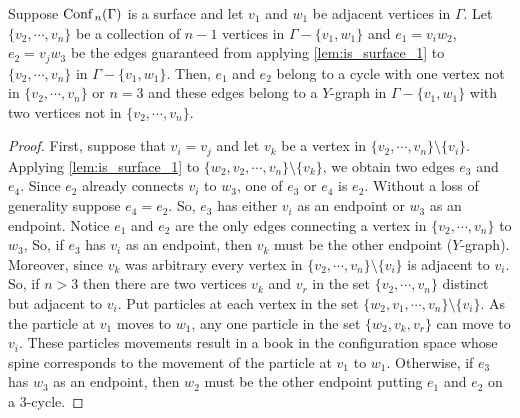 \begin{lem}
    \label{lem:is_surface_2}
    Suppose \(\text{Conf}\,_n(\Gamma)\) is a surface and let \(v_1\) and \(w_1\) be adjacent vertices in \(\Gamma\).
    Let \(\{v_2, \cdots, v_n\}\) be a collection of \(n-1\) vertices in \(\Gamma - \{v_1, w_1\}\) and \(e_1 = v_i w_2\), \(e_2 = v_j w_3\) be the edges guaranteed 
    from applying \ref{lem:is_surface_1} to \(\{v_2, \cdots, v_n\}\) in \(\Gamma - \{v_1, w_1\}\).
    Then, \(e_1\) and \(e_2\) belong to a cycle with one vertex not in \(\{v_2, \cdots, v_n\}\) or 
    \(n = 3\) and these edges belong to a \(Y\)-graph in \(\Gamma - \{v_1, w_1\}\)
    with two vertices not in \(\{v_2, \cdots, v_n\}\).
\end{lem}
\begin{proof}
    First, suppose that \(v_i = v_j\) and let \(v_k\) be a vertex in \(\{v_2, \cdots, v_n\}\setminus\{v_i\}\).
    Applying \ref{lem:is_surface_1} to \(\{w_2, v_2, \cdots, v_n\}\setminus\{v_k\}\),
    we obtain two edges \(e_3\) and \(e_4\).
    Since \(e_2\) already connects \(v_i\) to \(w_3\), one of \(e_3\) or \(e_4\) is \(e_2\).
    Without a loss of generality suppose \(e_4 = e_2\).
    So, \(e_3\) has either \(v_i\) as an endpoint or \(w_3\) as an endpoint.
    Notice \(e_1\) and \(e_2\) are the only edges connecting a vertex in \(\{v_2, \cdots, v_n\}\) to \(w_3\),
    So, if \(e_3\) has \(v_i\) as an endpoint, then \(v_k\) must be the other endpoint (\(Y\)-graph).
    Moreover, since \(v_k\) was arbitrary every vertex in \(\{v_2, \cdots, v_n\}\setminus\{v_i\}\) is adjacent to \(v_i\).
    So, if \(n > 3\) then there are two vertices \(v_k\) and \(v_r\) in the set \(\{v_2, \cdots, v_n\}\) distinct but adjacent to \(v_i\).
    Put particles at each vertex in the set \(\{w_2, v_1, \cdots, v_n\}\setminus\{v_i\}\).
    As the particle at \(v_1\) moves to \(w_1\), any one particle in the set \(\{w_2, v_k, v_r\}\) can move to \(v_i\).
    These particles movements result in a book in the configuration space whose spine corresponds to the movement of the particle at \(v_1\) to \(w_1\).
    Otherwise, if \(e_3\) has \(w_3\) as an endpoint, then \(w_2\) must be the other endpoint putting \(e_1\) and \(e_2\) on a \(3\)-cycle.


\end{proof}
